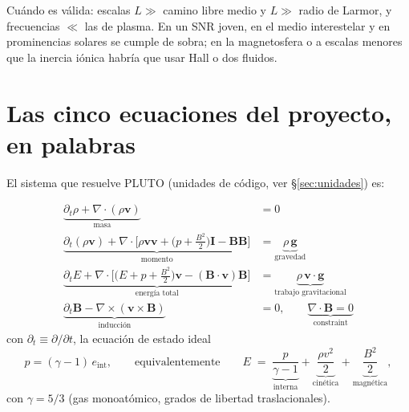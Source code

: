 \documentclass[11pt,a4paper]{article}
\newcommand{\B}{\mathbf{B}}
\newcommand{\vct}{\mathbf{v}}
\newcommand{\dif}{\partial_t}
\begin{document}
Cuándo es válida: escalas $L \gg$ camino libre medio y $L \gg$ radio de Larmor, y frecuencias
$\ll$ las de plasma. En un SNR joven, en el medio interestelar y en prominencias solares se
cumple de sobra; en la magnetosfera o a escalas menores que la inercia iónica habría que
usar Hall o dos fluidos.

\section{Las cinco ecuaciones del proyecto, en palabras}

El sistema que resuelve PLUTO (unidades de código, ver \S\ref{sec:unidades}) es:

\begin{align}
\underbrace{\dif{\rho} + \nabla\cdot(\rho\vct)}_{\text{masa}}
&= 0 \\[3pt]
\underbrace{\dif{(\rho\vct)} + \nabla\cdot\Big[\rho\vct\vct + \big(p+\tfrac{B^2}{2}\big)\mathbf{I} - \B\B\Big]}_{\text{momento}}
&= \underbrace{\rho\,\mathbf{g}}_{\text{gravedad}} \\[3pt]
\underbrace{\dif{E} + \nabla\cdot\Big[\big(E+p+\tfrac{B^2}{2}\big)\vct - (\B\cdot\vct)\B\Big]}_{\text{energía total}}
&= \underbrace{\rho\,\vct\cdot\mathbf{g}}_{\text{trabajo gravitacional}} \\[3pt]
\underbrace{\dif{\B} - \nabla\times(\vct\times\B)}_{\text{inducción}}
&= 0,
\qquad \underbrace{\nabla\cdot\B = 0}_{\text{constraint}}
\end{align}
con $\dif\equiv\partial/\partial t$, la ecuación de estado ideal
\begin{equation}
p = (\gamma-1)\,e_\mathrm{int},
\qquad\text{equivalentemente}\qquad
E \;=\; \underbrace{\frac{p}{\gamma-1}}_{\text{interna}}
+\underbrace{\frac{\rho v^2}{2}}_{\text{cinética}}
+\underbrace{\frac{B^2}{2}}_{\text{magnética}},
\end{equation}
con $\gamma=5/3$ (gas monoatómico, grados de libertad traslacionales).
\end{document}
